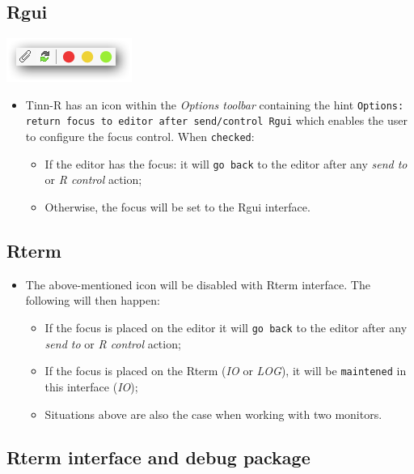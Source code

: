 \subsection{Rgui}

\includegraphics[scale=0.50]{./res/focus.png}

\begin{itemize}
  \item Tinn-R has an icon within the \textit{Options toolbar}
    containing the hint \texttt{Options: return focus to editor
      after send/control Rgui} which enables the user to configure
    the focus control. When \texttt{checked}:
    \begin{itemize}
      \item If the editor has the focus: it will \texttt{go back}
        to the editor after any \textit{send to} or \textit{R control}
        action;
      \item Otherwise, the focus will be set to the Rgui interface.
    \end{itemize}
\end{itemize}


\subsection{Rterm}

\begin{itemize}
  \item The above-mentioned icon will be disabled with Rterm interface.
    The following will then happen:
    \begin{itemize}
      \item If the focus is placed on the editor it will \texttt{go back}
        to the editor after any \textit{send to} or \textit{R control} action;
      \item If the focus is placed on the Rterm (\textit{IO} or \textit{LOG}),
        it will be \texttt{maintened} in this interface (\textit{IO});
      \item Situations above are also the case when working with two monitors.
    \end{itemize}
\end{itemize}


\newpage
\subsection{Rterm interface and debug package}

